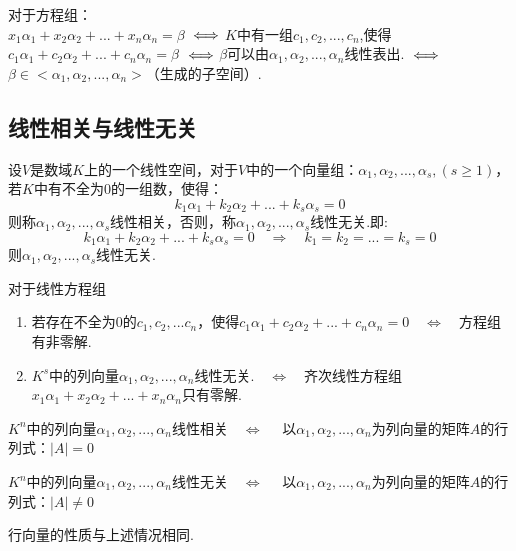 \documentclass[blue,normal,cn]{elegantnote}
\begin{document}
对于方程组：\\
$x_1α_1+x_2α_2+...+x_nα_n=β$ $
\\\Longleftrightarrow$
$K$中有一组$c_1,c_2,...,c_n$,使得$c_1α_1+c_2α_2+...+c_nα_n=β$
$\\\Longleftrightarrow$
$β$可以由$α_1,α_2,...,α_n$线性表出.
$\\\Longleftrightarrow$
$β ∈ <α_1,α_2,...,α_n>$（生成的子空间）.

\subsection{线性相关与线性无关}
\begin{definition}
    设$V$是数域$K$上的一个线性空间，对于$V$中的一个向量组：$α_1,α_2,...,α_s,(s≥1)$，若$K$中有不全为$0$的一组数，使得：
    $$
        k_1α_1+k_2 α_2+...+k_s α_s=0
    $$
    则称$α_1,α_2,...,α_s$线性相关，否则，称$α_1,α_2,...,α_s$线性无关.即:
    $$
        k_1 α_1+k_2 α_2+...+k_s α_s=0 \quad \Longrightarrow \quad k_1=k_2=...=k_s=0
    $$
    则$α_1,α_2,...,α_s$线性无关.
\end{definition}

对于线性方程组

\begin{enumerate}[(1)]
    \item 若存在不全为$0$的$c_1,c_2,...c_n$，使得$c_1α_1+c_2α_2+...+c_nα_n=0 \quad \Longleftrightarrow \quad $方程组有非零解. 
    \item $K^s$中的列向量$α_1,α_2,...,α_n$线性无关.$\quad \Longleftrightarrow \quad $齐次线性方程组$x_1α_1+x_2α_2+...+x_nα_n$只有零解.
\end{enumerate}

$K^n$中的列向量$α_1,α_2,...,α_n$线性相关$\quad \Longleftrightarrow \quad $ 以$α_1,α_2,...,α_n$为列向量的矩阵$A$的行列式：$|A|=0$

$K^n$中的列向量$α_1,α_2,...,α_n$线性无关$\quad \Longleftrightarrow \quad $ 以$α_1,α_2,...,α_n$为列向量的矩阵$A$的行列式：$|A|≠ 0$

行向量的性质与上述情况相同.
\end{document}
